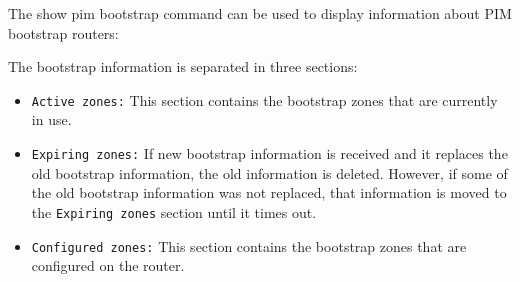 The {\stt show pim bootstrap} command can be used to display
information about PIM bootstrap routers:

\vspace{0.1in}
\noindent{}
\vspace{0.1in}

The bootstrap information is separated in three sections:
\begin{itemize}

  \item {\tt Active zones:} This section contains the bootstrap zones that are
  currently in use.

  \item {\tt Expiring zones:} If new bootstrap information is received and it
  replaces the old bootstrap information, the old information is deleted.
  However, if some of the old bootstrap information was not replaced,
  that information is moved to the {\tt Expiring zones} section until
  it times out.

  \item {\tt Configured zones:} This section contains the bootstrap zones that
  are configured on the router.

\end{itemize}

